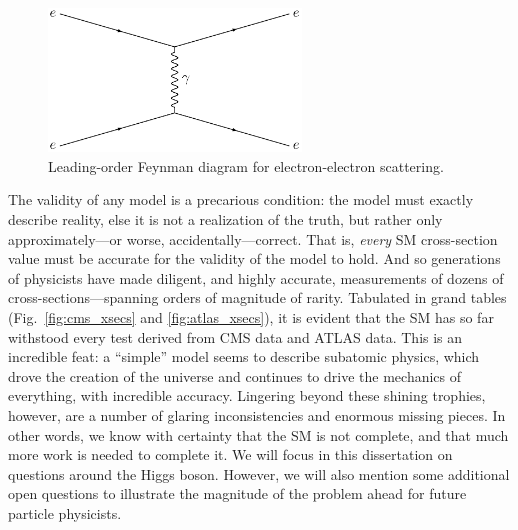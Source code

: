 \begin{figure}[htb]
    \centering
    \includegraphics[width=0.6\textwidth]{fig/feynman/other/ee_scattering.pdf}
    \caption{
        Leading-order Feynman diagram for electron-electron scattering. 
    }
    \label{fig:ee_scattering}
\end{figure}

The validity of any model is a precarious condition: the model must exactly describe reality, else it is not a realization of the truth, but rather only approximately---or worse, accidentally---correct. 
That is, \textit{every} SM cross-section value must be accurate for the validity of the model to hold. 
And so generations of physicists have made diligent, and highly accurate, measurements of dozens of cross-sections---spanning orders of magnitude of rarity. 
Tabulated in grand tables (Fig.~\ref{fig:cms_xsecs} and \ref{fig:atlas_xsecs}), it is evident that the SM has so far withstood every test derived from CMS data and ATLAS data. 
This is an incredible feat: a ``simple'' model seems to describe subatomic physics, which drove the creation of the universe and continues to drive the mechanics of everything, with incredible accuracy. 
Lingering beyond these shining trophies, however, are a number of glaring inconsistencies and enormous missing pieces. 
In other words, we know with certainty that the SM is not complete, and that much more work is needed to complete it. 
We will focus in this dissertation on questions around the Higgs boson. 
However, we will also mention some additional open questions to illustrate the magnitude of the problem ahead for future particle physicists. 


